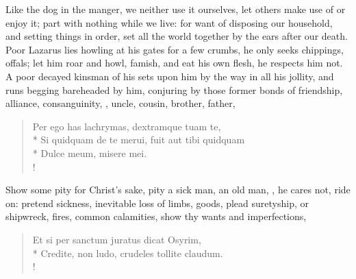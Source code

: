 {Like the dog in the manger, we neither use it ourselves, let others
make use of or enjoy it; part with nothing while we live: for want of
disposing our household, and setting things in order, set all the world
together by the ears after our death. Poor Lazarus lies howling at his
gates for a few crumbs, he only seeks chippings, offals; let him roar
and howl, famish, and eat his own flesh, he respects him not. A poor
decayed kinsman of his sets upon him by the way in all his jollity, and
runs begging bareheaded by him, conjuring by those former bonds of
friendship, alliance, consanguinity, \etc{}, uncle, cousin, brother,
father,
%
\begin{latin}
\begin{verse}
Per ego has lachrymas, dextramque tuam te,\\*
Si quidquam de te merui, fuit aut tibi quidquam\\*
Dulce meum, misere mei.\\!
\end{verse}
\end{latin}

Show some pity for Christ's sake, pity a sick man, an old man, \etc{}, he
cares not, ride on: pretend sickness, inevitable loss of limbs, goods,
plead suretyship, or shipwreck, fires, common calamities, show thy
wants and imperfections,
%
\begin{latin}
\begin{verse}
Et si per sanctum juratus dicat Osyrim,\\*
Credite, non ludo, crudeles tollite claudum.\\!
\end{verse}
\end{latin}

}
